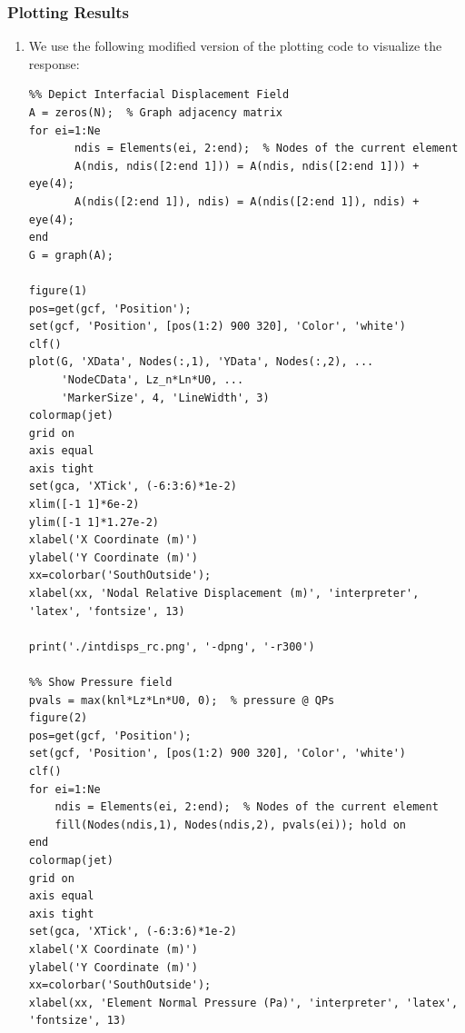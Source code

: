 \documentclass[11pt]{article}
\begin{document}
\subsubsection{Plotting Results}
\label{sec:org40ed2e8}
\begin{enumerate}
\item We use the following modified version of the plotting code to visualize the response:
\begin{verbatim}
%% Depict Interfacial Displacement Field
A = zeros(N);  % Graph adjacency matrix
for ei=1:Ne
       ndis = Elements(ei, 2:end);  % Nodes of the current element
       A(ndis, ndis([2:end 1])) = A(ndis, ndis([2:end 1])) + eye(4);
       A(ndis([2:end 1]), ndis) = A(ndis([2:end 1]), ndis) + eye(4);
end
G = graph(A);

figure(1)
pos=get(gcf, 'Position');
set(gcf, 'Position', [pos(1:2) 900 320], 'Color', 'white')
clf()
plot(G, 'XData', Nodes(:,1), 'YData', Nodes(:,2), ...
     'NodeCData', Lz_n*Ln*U0, ...
     'MarkerSize', 4, 'LineWidth', 3)
colormap(jet)
grid on
axis equal
axis tight
set(gca, 'XTick', (-6:3:6)*1e-2)
xlim([-1 1]*6e-2)
ylim([-1 1]*1.27e-2)
xlabel('X Coordinate (m)')
ylabel('Y Coordinate (m)')
xx=colorbar('SouthOutside');
xlabel(xx, 'Nodal Relative Displacement (m)', 'interpreter', 'latex', 'fontsize', 13)

print('./intdisps_rc.png', '-dpng', '-r300')

%% Show Pressure field
pvals = max(knl*Lz*Ln*U0, 0);  % pressure @ QPs
figure(2)
pos=get(gcf, 'Position');
set(gcf, 'Position', [pos(1:2) 900 320], 'Color', 'white')
clf()
for ei=1:Ne
    ndis = Elements(ei, 2:end);  % Nodes of the current element
    fill(Nodes(ndis,1), Nodes(ndis,2), pvals(ei)); hold on
end
colormap(jet)
grid on
axis equal
axis tight
set(gca, 'XTick', (-6:3:6)*1e-2)
xlabel('X Coordinate (m)')
ylabel('Y Coordinate (m)')
xx=colorbar('SouthOutside');
xlabel(xx, 'Element Normal Pressure (Pa)', 'interpreter', 'latex', 'fontsize', 13)


\end{verbatim}
\end{enumerate}
\end{document}
